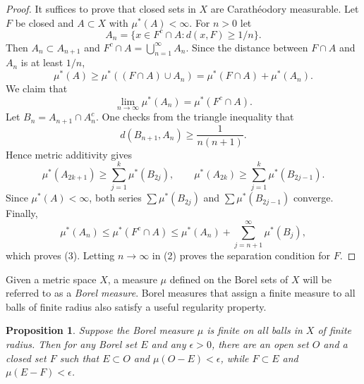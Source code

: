 \documentclass[11pt,openany]{book}
\newtheorem{proposition}[theorem]{Proposition}
\begin{document}
\begin{proof}
It suffices to prove that closed sets in $X$ are Carath\'eodory measurable. Let $F$ be closed and $A\subset X$ with $\mu^*(A)<\infty$. For $n>0$ let
\[
A_n=\{x\in F^c\cap A:d(x,F)\geq1/n\}.
\]
Then $A_n\subset A_{n+1}$ and $F^c\cap A=\bigcup_{n=1}^{\infty}A_n$. Since the distance between $F\cap A$ and $A_n$ is at least $1/n$,
\begin{equation}
\mu^*(A)\geq \mu^*((F\cap A)\cup A_n)=\mu^*(F\cap A)+\mu^*(A_n).
\tag{2}
\end{equation}
We claim that
\begin{equation}
\lim_{n\to\infty}\mu^*(A_n)=\mu^*(F^c\cap A).
\tag{3}
\end{equation}
Let $B_n=A_{n+1}\cap A_n^c$. One checks from the triangle inequality that
\[
d(B_{n+1},A_n)\geq \frac1{n(n+1)}.
\]
Hence metric additivity gives
\[
\mu^*(A_{2k+1})\geq \sum_{j=1}^{k}\mu^*(B_{2j}),
\qquad
\mu^*(A_{2k})\geq \sum_{j=1}^{k}\mu^*(B_{2j-1}).
\]
Since $\mu^*(A)<\infty$, both series $\sum\mu^*(B_{2j})$ and $\sum\mu^*(B_{2j-1})$ converge. Finally,
\[
\mu^*(A_n)\leq\mu^*(F^c\cap A)
\leq\mu^*(A_n)+\sum_{j=n+1}^{\infty}\mu^*(B_j),
\]
which proves (3). Letting $n\to\infty$ in (2) proves the separation condition for $F$.
\end{proof}

Given a metric space $X$, a measure $\mu$ defined on the Borel sets of $X$ will be referred to as a \emph{Borel measure}. Borel measures that assign a finite measure to all balls of finite radius also satisfy a useful regularity property.

\begin{proposition}
Suppose the Borel measure $\mu$ is finite on all balls in $X$ of finite radius. Then for any Borel set $E$ and any $\epsilon>0$, there are an open set $O$ and a closed set $F$ such that $E\subset O$ and $\mu(O-E)<\epsilon$, while $F\subset E$ and $\mu(E-F)<\epsilon$.
\end{proposition}
\end{document}
